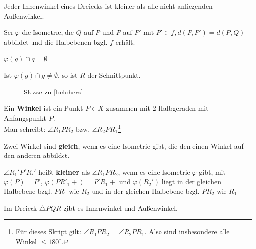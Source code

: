 \begin{bemerkung}
    Jeder Innenwinkel eines Dreiecks ist kleiner als alle nicht-anliegenden
    Außenwinkel.
\end{bemerkung}

\begin{beweis}
    Sei $\varphi$ die Isometrie, die $Q$ auf $P$ und $P$ auf $P'$
    mit $P' \in f, d(P,P') = d(P, Q)$ abbildet und die Halbebenen
    bzgl. $f$ erhält.
\end{beweis}

\begin{behauptung}[Herz]\label{beh:herz}
    $\varphi(g) \cap g = \emptyset$
\end{behauptung}

\begin{beweis}
    Ist $\varphi(g) \cap g \neq \emptyset$, so ist $R$ der Schnittpunkt.
\end{beweis}

\begin{figure}[htp]
    \centering
    
    \caption{Skizze zu \cref{beh:herz}}
    \label{fig:bild-6}
\end{figure}

\begin{definition}\label{def:14.8}%
    \begin{defenum}
        \item \label{def:14.8a} Ein \textbf{Winkel} ist ein Punkt $P \in X$ 
              zusammen mit $2$ Halbgeraden mit Anfangspunkt $P$.\\
              Man schreibt: $\angle R_1 P R_2$ bzw. $\angle R_2 P R_1$\footnote{Für dieses Skript gilt: $\angle R_1 P R_2 = \angle R_2 P R_1$. Also sind insbesondere alle Winkel $ \leq 180^\circ$.}
        \item Zwei Winkel sind \textbf{gleich}, wenn es eine Isometrie gibt, 
              die den einen Winkel auf den anderen abbildet.
        \item \label{def:14.8c} $\angle R_1' P' R_2'$ heißt \textbf{kleiner} als
              $\angle R_1 P R_2$, wenn es eine Isometrie $\varphi$
              gibt, mit $\varphi(P) = P'$, $\varphi(PR'_1+) = P' R_1 +$
              und $\varphi(R_2')$ liegt in der gleichen Halbebene 
              bzgl. $PR_1$ wie $R_2$ und in der gleichen Halbebene
              bzgl. $PR_2$ wie $R_1$
        \item \label{def:14.8d} Im Dreieck $\triangle PQR$ gibt es Innenwinkel und
              Außenwinkel.
    \end{defenum}
\end{definition}

